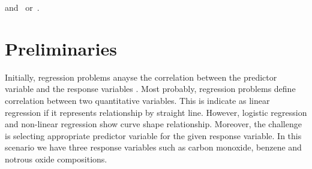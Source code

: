 


and~\citep{BJL11J01} or~\citet{BJL11J01}.

%











\section{Preliminaries} \label{sec-preliminaries}

Initially, regression problems 
anayse the correlation between 
the predictor variable and the response variables \cite{uyanik2013study}.
Most probably, regression problems define correlation 
between two quantitative variables.
This is indicate as linear regression if it represents 
relationship by straight line. 
However, logistic regression and non-linear regression show curve shape relationship. 
Moreover, the challenge is 
selecting appropriate predictor 
variable for the given response variable. 
In this scenario we have three 
response variables such as 
carbon monoxide, benzene and notrous oxide compositions.

